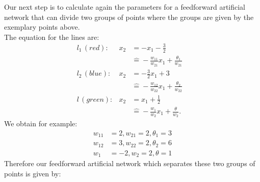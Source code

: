 \begin{figure}[H]
\centering
{}
\end{figure} \FigureHSpace
Our next step is to calculate again the parameters for a feedforward artificial network that can divide two groups of points where the groups are given by the exemplary points above.\\
The equation for the lines are:
\begin{align*}
&l_1\, (red):  & x_2&= -x_1 - \frac{3}{2}  & & \\
 & & &\widehat{=} -\frac{w_{11}}{w_{21}}x_1 + \frac{\theta_1}{w_{21}} \\
&l_2\, (blue): & x_2&= -\frac{3}{2}x_1 + 3 \\
 & & &\widehat{=} -\frac{w_{12}}{w_{22}}x_1 + \frac{\theta_2}{w_{22}} \\
&l\, (green): & x_2&= x_1 + \frac{1}{2} \\
 & & &\widehat{=} -\frac{w_1}{w_2}x_1 + \frac{\theta}{w_2}.
\end{align*}
We obtain for example:
\begin{align*}
w_{11} &= 2, w_{21} = 2, \theta_1 = 3 \\
w_{12} &= 3, w_{22} = 2, \theta_2 = 6 \\
w_1 &= -2, w_2 = 2, \theta = 1
\end{align*}
Therefore our feedforward artificial network which separates these two groups of points is given by:

